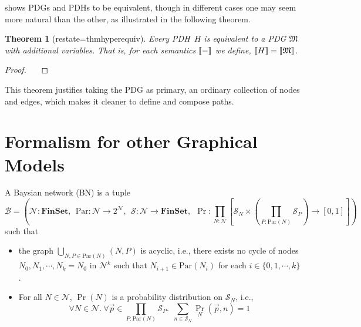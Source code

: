 \documentclass{article}
\theoremstyle{plain}
\newtheorem{theorem}{Theorem}[section]
\theoremstyle{definition}
\theoremstyle{remark}
\DeclarePairedDelimiter{\bbr}{\llbracket}{\rrbracket}
\newcommand{\todo}[1]{{\color{red}\ \!\Large\smash{\textbf{[}}{\normalsize\textsc{todo:} #1}\ \!\smash{\textbf{]}}}}
\newcommand{\dg}[1]{\mathfrak{#1}}
\newcommand{\MNH}{PDH}
\numberwithin{equation}{section}
\begin{document}
	 shows PDGs and \MNH s to be equivalent, though in different cases one may seem more natural than the other, as illustrated in the following theorem.
	
	\begin{theorem}[restate=thmhyperequiv]\label{thm:hyperequiv}
		Every \MNH\ $H$ is equivalent to a PDG $\dg M$ with additional variables. That is, for each semantics $\bbr{-}$ we define, $\bbr{H} = \bbr{\dg M}$.
	\end{theorem}
	\begin{proof}
		\todo{}
	\end{proof}
	
	This theorem justifies taking the PDG as primary, an ordinary collection of nodes and edges, which makes it cleaner to define and compose paths. 

	
	\section{Formalism for other Graphical Models}
	\begin{defn}
		A Baysian network (BN) is a tuple
		\[
		\mathcal B = \left(\mathcal N : \mathbf{FinSet}, ~~\mathrm{Par}: \mathcal N \to 2^{\mathcal N},~~ \mathcal S: \mathcal N \to \mathbf{FinSet},~~\Pr: \prod_{N : \mathcal N}  \left[ \mathcal S_N \times \left(\prod_{P : \mathrm{Par}(N)} \mathcal S_P\right)  \to [0,1] \right] \right)
		\]
		such that
		\begin{itemize}[nosep]
			\item the graph $\bigcup_{N, P \in \mathrm{Par}(N)}(N, P)$ is acyclic, i.e., there exists no cycle of nodes $N_0, N_1, \cdots, N_k = N_0$ in $\mathcal N^k$ such that $N_{i+1} \in \mathrm{Par}(N_i)$ for each $i \in \{0, 1, \cdots, k\}$.
			\item For all $N \in \mathcal N$, $\Pr(N)$ is a probability distribution on $\mathcal S_N$, i.e., 
			\[ \forall N\in \mathcal N.~\forall \vec{p} \in {\prod_{P : \mathrm{Par}(N)} \mathcal S_P}.~~ \sum_{n \in \mathcal S_{N}} \Pr_N(\vec{p}, n) = 1\]
		\end{itemize}
	\end{defn}
	
\end{document}
